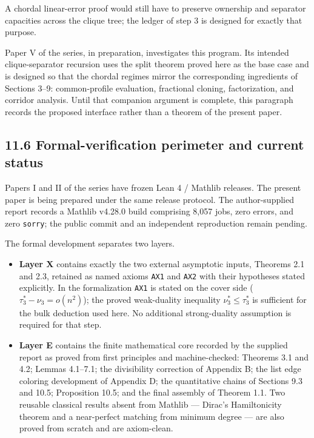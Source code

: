 \documentclass[
  11pt,
]{article}
\providecommand{\tightlist}{%
  \setlength{\itemsep}{0pt}\setlength{\parskip}{0pt}}
\begin{document}
A chordal linear-error proof would still have to preserve ownership and separator capacities across the clique tree; the ledger of step 3 is designed for exactly that purpose.

Paper V of the series, in preparation, investigates this program. Its intended clique-separator recursion uses the split theorem proved here as the base case and is designed so that the chordal regimes mirror the corresponding ingredients of Sections 3--9: common-profile evaluation, fractional cloning, factorization, and corridor analysis. Until that companion argument is complete, this paragraph records the proposed interface rather than a theorem of the present paper.

\subsection{11.6 Formal-verification perimeter and current status}\label{formal-verification-perimeter-and-current-status}

Papers I and II of the series have frozen Lean 4 / Mathlib releases. The present paper is being prepared under the same release protocol. The author-supplied report records a Mathlib v4.28.0 build comprising 8,057 jobs, zero errors, and zero \texttt{sorry}; the public commit and an independent reproduction remain pending.

The formal development separates two layers.

\begin{itemize}
\tightlist
\item
  \textbf{Layer X} contains exactly the two external asymptotic inputs, Theorems 2.1 and 2.3, retained as named axioms \texttt{AX1} and \texttt{AX2} with their hypotheses stated explicitly. In the formalization \texttt{AX1} is stated on the cover side (\(\tau_3^*-\nu_3=o(n^2)\)); the proved weak-duality inequality \(\nu_3^*\le\tau_3^*\) is sufficient for the bulk deduction used here. No additional strong-duality assumption is required for that step.
\item
  \textbf{Layer E} contains the finite mathematical core recorded by the supplied report as proved from first principles and machine-checked: Theorems 3.1 and 4.2; Lemmas 4.1--7.1; the divisibility correction of Appendix B; the list edge coloring development of Appendix D; the quantitative chains of Sections 9.3 and 10.5; Proposition 10.5; and the final assembly of Theorem 1.1. Two reusable classical results absent from Mathlib --- Dirac's Hamiltonicity theorem and a near-perfect matching from minimum degree --- are also proved from scratch and are axiom-clean.
\end{itemize}
\end{document}

